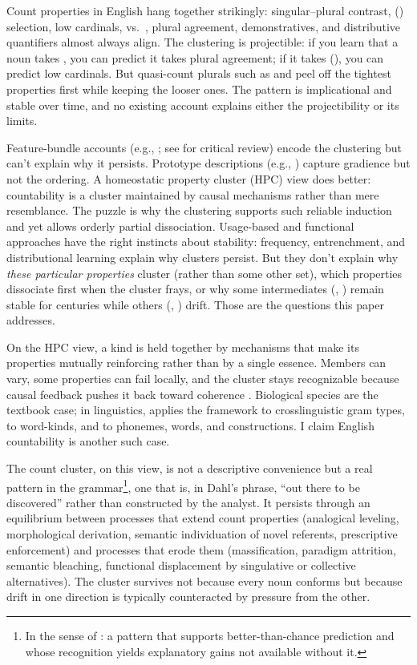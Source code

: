 \documentclass[12pt,a4paper]{article}
\begin{document}
Count properties in English hang together strikingly: singular--plural contrast, () selection, low cardinals,  vs.\ , plural agreement, demonstratives, and distributive quantifiers almost always align. The clustering is projectible: if you learn that a noun takes , you can predict it takes plural agreement; if it takes (), you can predict low cardinals. But quasi-count plurals such as  and  peel off the tightest properties first while keeping the looser ones. The pattern is implicational and stable over time, and no existing account explains either the projectibility or its limits.

Feature-bundle accounts (e.g., \citealt{chomsky1965}; see \citealt{allan1980} for critical review) encode the clustering but can't explain why it persists. Prototype descriptions (e.g., \citealt{taylor2003,aarts2007}) capture gradience but not the ordering. A homeostatic property cluster (HPC) view does better: countability is a cluster maintained by causal mechanisms rather than mere resemblance. The puzzle is why the clustering supports such reliable induction and yet allows orderly partial dissociation. Usage-based and functional approaches have the right instincts about stability: frequency, entrenchment, and distributional learning explain why clusters persist. But they don't explain why \textit{these particular properties} cluster (rather than some other set), which properties dissociate first when the cluster frays, or why some intermediates (, ) remain stable for centuries while others (, ) drift. Those are the questions this paper addresses.

On the HPC view, a kind is held together by mechanisms that make its properties mutually reinforcing rather than by a single essence. Members can vary, some properties can fail locally, and the cluster stays recognizable because causal feedback pushes it back toward coherence \citep{boyd1991,khalidi2013}. Biological species are the textbook case; in linguistics, \textcite{dahl2016} applies the framework to crosslinguistic gram types, \textcite{miller2021} to word-kinds, and \textcite{reynolds2025stack} to phonemes, words, and constructions. I claim English countability is another such case.

The count cluster, on this view, is not a descriptive convenience but a real pattern in the grammar\footnote{In the sense of \textcite{dennett1991}: a pattern that supports better-than-chance prediction and whose recognition yields explanatory gains not available without it.}, one that is, in Dahl's phrase, \enquote{out there to be discovered} rather than constructed by the analyst. It persists through an equilibrium between processes that extend count properties (analogical leveling, morphological derivation, semantic individuation of novel referents, prescriptive enforcement) and processes that erode them (massification, paradigm attrition, semantic bleaching, functional displacement by singulative or collective alternatives). The cluster survives not because every noun conforms but because drift in one direction is typically counteracted by pressure from the other.
\end{document}
